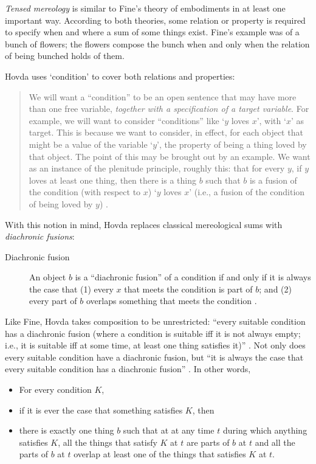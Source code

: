 \documentclass[12pt,twoside]{reedfancy}
\begin{document}
\begin{spacing}{1.25}
{\em Tensed mereology} is similar to Fine's theory of embodiments in
at least one important way.  According to both theories, some relation
or property is required to specify when and where a sum of some things
exist.  Fine's example was of a bunch of flowers; the flowers compose
the bunch when and only when the relation of being bunched holds of
them.

Hovda uses `condition' to cover both relations and properties:

\begin{quote}
We will want a ``condition'' to be an open sentence that may have more
than one free variable, \emph{together with a specification of a
  target variable}. For example, we will want to consider
``conditions'' like `$y$ loves $x$', with `$x$' as target.  This is
because we want to consider, in effect, for each object that might be
a value of the variable `$y$', the property of being a thing loved by
that object.  The point of this may be brought out by an example.  We
want as an instance of the plenitude principle, roughly this: that for
every $y$, if $y$ loves at least one thing, then there is a thing $b$
such that $b$ is a fusion of the condition (with respect to $x$) `$y$
loves $x$' (i.e., a fusion of the condition of being loved by $y$)
\citeyearpar[sec. 1.1n2]{hovda2011}.
\end{quote}

With this notion in mind, Hovda replaces classical mereological sums
with {\em diachronic fusions}:

\begin{description}
  \item[Diachronic fusion] An object $b$ is a ``diachronic fusion'' of
    a condition if and only if it is always the case that (1) every
    $x$ that meets the condition is part of $b$; and (2) every part of
    $b$ overlaps something that meets the condition
    \citeyearpar[sec. 1.1]{hovda2011}.
\end{description}

Like Fine, Hovda takes composition to be unrestricted: ``every
suitable condition has a diachronic fusion (where a condition is
suitable iff it is not always empty; i.e., it is suitable iff at some
time, at least one thing satisfies it)'' \citeyearpar[sec.
  3.1]{hovda2011}.  Not only does every suitable condition have a
diachronic fusion, but ``it is always the case that every suitable
condition has a diachronic fusion''
\citeyearpar[sec. 3.1.1]{hovda2011}.  In other words,

\begin{itemize}
  \item For every condition $K$,
  \item if it is ever the case that something satisfies $K$, then
  \item there is exactly one thing $b$ such that at at any time $t$
    during which anything satisfies $K$, all the things that satisfy
    $K$ at $t$ are parts of $b$ at $t$ and all the parts of $b$ at $t$
    overlap at least one of the things that satisfies $K$ at $t$.
\end{itemize}


\end{spacing}
\end{document}
